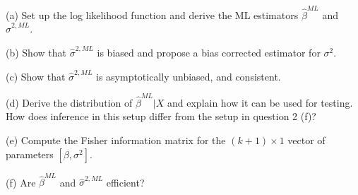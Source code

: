 \documentclass{article}
\begin{document}
(a) Set up the log likelihood function and derive the ML estimators $%
\widehat{\beta }^{ML}$ and $\widehat{\sigma }^{2,ML}.$

(b) Show that $\widehat{\sigma }^{2,ML}$ is biased and propose a bias
corrected estimator for $\sigma ^{2}.$

(c) Show that $\widehat{\sigma }^{2,ML}$ is asymptotically unbiased, and
consistent.

(d) Derive the distribution of $\widehat{\beta }^{ML}|X$ and explain how it
can be used for testing. How does inference in this setup differ from the
setup in question 2 (f)?

(e) Compute the Fisher information matrix for the $(k+1)\times 1$ vector of
parameters $[\beta ,\sigma ^{2}].$

(f) Are $\widehat{\beta }^{ML}$ and $\widehat{\sigma }^{2,ML}$ efficient?
\end{document}
